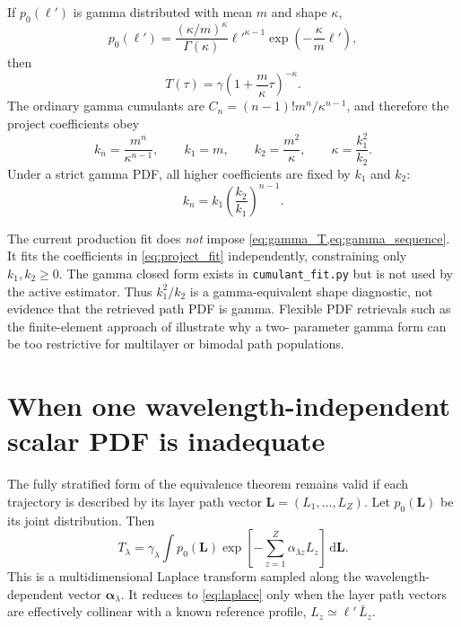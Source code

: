 \documentclass[11pt]{article}
\newcommand{\dd}{\,\mathrm{d}}
\newcommand{\lp}{\ell'}
\begin{document}
If $p_0(\lp)$ is gamma distributed with mean $m$ and shape $\kappa$,
\begin{equation}
  p_0(\lp)
  = \frac{(\kappa/m)^\kappa}{\Gamma(\kappa)}
    \lp^{\kappa-1}\exp\!\left(-\frac{\kappa}{m}\lp\right),
  \label{eq:gamma_pdf}
\end{equation}
then
\begin{equation}
  T(\tau)
  = \gamma\left(1+\frac{m}{\kappa}\tau\right)^{-\kappa}.
  \label{eq:gamma_T}
\end{equation}
The ordinary gamma cumulants are
$C_n=(n-1)!m^n/\kappa^{n-1}$, and therefore the project coefficients obey
\begin{equation}
  k_n=\frac{m^n}{\kappa^{n-1}},
  \qquad
  k_1=m,
  \qquad
  k_2=\frac{m^2}{\kappa},
  \qquad
  \kappa=\frac{k_1^2}{k_2}.
  \label{eq:gamma_mapping}
\end{equation}
Under a strict gamma PDF, all higher coefficients are fixed by $k_1$ and $k_2$:
\begin{equation}
  k_n=k_1\left(\frac{k_2}{k_1}\right)^{n-1}.
  \label{eq:gamma_sequence}
\end{equation}

The current production fit does \emph{not} impose
\cref{eq:gamma_T,eq:gamma_sequence}.  It fits the coefficients in
\cref{eq:project_fit} independently, constraining only $k_1,k_2\geq0$.
The gamma closed form exists in \texttt{cumulant\_fit.py} but is not used by the
active estimator.  Thus $k_1^2/k_2$ is a gamma-equivalent shape diagnostic, not
evidence that the retrieved path PDF is gamma.  Flexible PDF retrievals such as
the finite-element approach of \citet{bennartz2006} illustrate why a two-
parameter gamma form can be too restrictive for multilayer or bimodal path
populations.

\section{When one wavelength-independent scalar PDF is inadequate}

The fully stratified form of the equivalence theorem remains valid if each
trajectory is described by its layer path vector
$\bm L=(L_1,\ldots,L_Z)$.  Let $p_0(\bm L)$ be its joint distribution.  Then
\begin{equation}
  T_\lambda
  = \gamma_\lambda
    \int p_0(\bm L)
    \exp\!\left[-\sum_{z=1}^{Z}\alpha_{\lambda z}L_z\right]\dd\bm L.
  \label{eq:multidimensional}
\end{equation}
This is a multidimensional Laplace transform sampled along the wavelength-
dependent vector $\bm\alpha_\lambda$.  It reduces to
\cref{eq:laplace} only when the layer path vectors are effectively collinear
with a known reference profile, $L_z\simeq\lp\,\bar L_z$.
\end{document}
